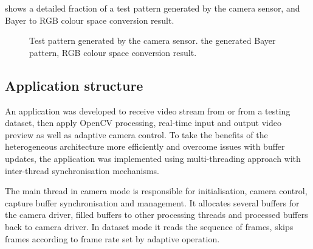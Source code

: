  shows a detailed fraction of a test pattern generated by the camera sensor, and Bayer to RGB colour space conversion result.

\begin{figure}[H]
  \centering
  \caption{Test pattern generated by the camera sensor.  the generated Bayer pattern,  RGB colour space conversion result.}
  \label{imp:bayer_eg}
\end{figure}



\subsection{Application structure}

An application was developed to receive video stream from  or from a testing dataset, then apply OpenCV processing, real-time input and output video preview as well as adaptive camera control. To take the benefits of the heterogeneous architecture more efficiently and overcome issues with buffer updates, the application was implemented using multi-threading approach with inter-thread synchronisation mechanisms.

The main thread in camera mode is responsible for initialisation, camera control, capture buffer synchronisation and management. It allocates several buffers for the camera driver,  filled buffers to other processing threads and  processed buffers back to camera driver. In dataset mode it reads the sequence of frames, skips frames according to frame rate set by adaptive operation. 

